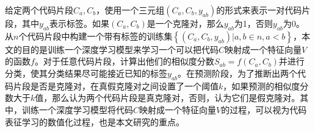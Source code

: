         

    
    

    

给定两个代码片段$C_{a},C_{b}$，使用一个三元组$(C_{a},C_{b},y_{ab})$的形式来表示一对代码片段，其中$y_{ab}$表示标签。如果$(C_{a},C_{b})$是一个克隆对，那么$y_{ab}$为1，否则$y_{ab}$为0。从$n$个代码片段中构建一个带有标签的训练集$\left\{(C_{a},C_{b},y_{ab})|a,b \in n,a<b\right\}$，本文的目的是训练一个深度学习模型来学习一个可以把代码$C$映射成一个特征向量$V$的函数$f$。对于任意代码片段，计算出他们的相似度分数$S_{ab} = f(C_{a},C_{b})$并进行分类，使其分类结果尽可能接近已知的标签$y_{ab}$。在预测阶段，为了推断出两个代码片段是否是克隆对，在真假克隆对之间设置了一个阈值$k$，如果预测的相似度分数大于$k$值，那么认为两个代码片段是真克隆对，否则，认为它们是假克隆对。其中，训练一个深度学习模型将代码$C$映射成一个特征向量$V$的过程，可以视为代码表征学习的数值化过程，也是本文研究的重点。

